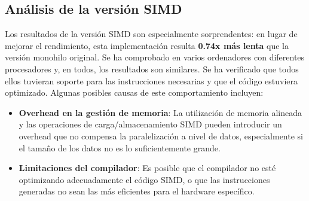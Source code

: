 \documentclass[11pt,a4paper]{article}
\begin{document}
\subsection{Análisis de la versión SIMD}
Los resultados de la versión SIMD son especialmente sorprendentes: en lugar de mejorar el rendimiento,
 esta implementación resulta \textbf{0.74x más lenta} que la versión 
 monohilo original. Se ha comprobado en varios ordenadores con diferentes
  procesadores y, en todos, los resultados son similares. 
  Se ha verificado que todos ellos tuvieran soporte para las 
  instrucciones necesarias y que el código estuviera optimizado. Algunas posibles causas de este comportamiento incluyen:
\begin{itemize}
    \item \textbf{Overhead en la gestión de memoria}: La utilización de memoria alineada y las operaciones de carga/almacenamiento SIMD pueden introducir un overhead que no compensa la paralelización a nivel de datos, especialmente si el tamaño de los datos no es lo suficientemente grande.
    \item \textbf{Limitaciones del compilador}: Es posible que el compilador no esté optimizando adecuadamente el código SIMD, o que las instrucciones generadas no sean las más eficientes para el hardware específico.
\end{itemize}
\newpage
\end{document}
